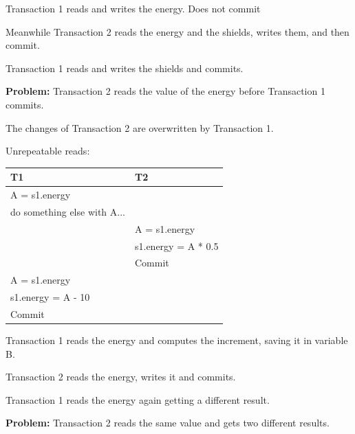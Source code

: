 \documentclass{beamer}
\begin{document}
\begin{slide}{
	\item Transaction 1 reads and writes the energy. Does not commit
	\item Meanwhile Transaction 2 reads the energy and the shields, writes them, and then commit.
	\item Transaction 1 reads and writes the shields and commits.
	\item \textbf{Problem:} Transaction 2 reads the value of the energy before Transaction 1 commits.
	\item The changes of Transaction 2 are overwritten by Transaction 1.
}\end{slide}

\begin{slide}{
		\item Unrepeatable reads:
		\begin{table}
			\tiny
			\begin{tabular}{l|l}
				T1 & T2\\
				\hline
				A = s1.energy & \\
				do something else with A... & \\
				& A = s1.energy \\
				& s1.energy = A * 0.5 \\
				& Commit \\
				A = s1.energy & \\
				s1.energy = A - 10 & \\
				Commit &
			\end{tabular}
		\end{table}	
	}\end{slide}
	
\begin{slide}{
		\item Transaction 1 reads the energy and computes the increment, saving it in variable B.
		\item Transaction 2 reads the energy, writes it and commits.
		\item Transaction 1 reads the energy again getting a different result.
		\item \textbf{Problem:} Transaction 2 reads the same value and gets two different results.
	}\end{slide}
	
\end{document}
